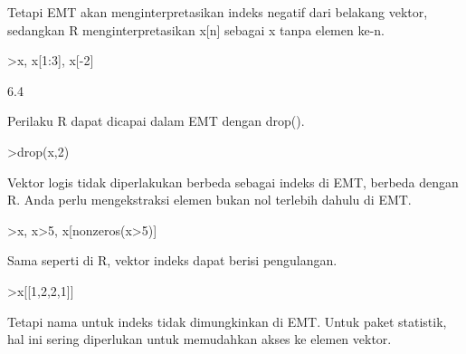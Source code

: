 \documentclass[a4paper,10pt]{article}
\begin{document}
\begin{eulernotebook}
\begin{eulercomment}
\begin{eulercomment}
\begin{eulercomment}
\begin{eulercomment}
\begin{eulercomment}
\begin{eulercomment}
\begin{eulercomment}
\begin{eulercomment}
\begin{eulercomment}
\begin{eulercomment}
\begin{eulercomment}
\begin{eulercomment}
\begin{eulercomment}
\begin{eulercomment}
\begin{eulercomment}
\begin{eulercomment}
\begin{eulercomment}
\begin{eulercomment}
\begin{eulercomment}
Tetapi EMT akan menginterpretasikan indeks negatif dari belakang
vektor, sedangkan R menginterpretasikan x[n] sebagai x tanpa elemen
ke-n.
\end{eulercomment}
\begin{eulerprompt}
>x, x[1:3], x[-2]
\end{eulerprompt}
\begin{euleroutput}
  [10.4,  5.6,  3.1,  6.4,  21.7]
  [10.4,  5.6,  3.1]
  6.4
\end{euleroutput}
\begin{eulercomment}
Perilaku R dapat dicapai dalam EMT dengan drop().
\end{eulercomment}
\begin{eulerprompt}
>drop(x,2)
\end{eulerprompt}
\begin{euleroutput}
  [10.4,  3.1,  6.4,  21.7]
\end{euleroutput}
\begin{eulercomment}
Vektor logis tidak diperlakukan berbeda sebagai indeks di EMT, berbeda
dengan R. Anda perlu mengekstraksi elemen bukan nol terlebih dahulu di
EMT.
\end{eulercomment}
\begin{eulerprompt}
>x, x>5, x[nonzeros(x>5)]
\end{eulerprompt}
\begin{euleroutput}
  [10.4,  5.6,  3.1,  6.4,  21.7]
  [1,  1,  0,  1,  1]
  [10.4,  5.6,  6.4,  21.7]
\end{euleroutput}
\begin{eulercomment}
Sama seperti di R, vektor indeks dapat berisi pengulangan.
\end{eulercomment}
\begin{eulerprompt}
>x[[1,2,2,1]]
\end{eulerprompt}
\begin{euleroutput}
  [10.4,  5.6,  5.6,  10.4]
\end{euleroutput}
\begin{eulercomment}
Tetapi nama untuk indeks tidak dimungkinkan di EMT. Untuk paket
statistik, hal ini sering diperlukan untuk memudahkan akses ke elemen
vektor.


\end{eulercomment}
\end{eulercomment}
\end{eulercomment}
\end{eulercomment}
\end{eulercomment}
\end{eulercomment}
\end{eulercomment}
\end{eulercomment}
\end{eulercomment}
\end{eulercomment}
\end{eulercomment}
\end{eulercomment}
\end{eulercomment}
\end{eulercomment}
\end{eulercomment}
\end{eulercomment}
\end{eulercomment}
\end{eulercomment}
\end{eulercomment}
\end{eulernotebook}
\end{document}
